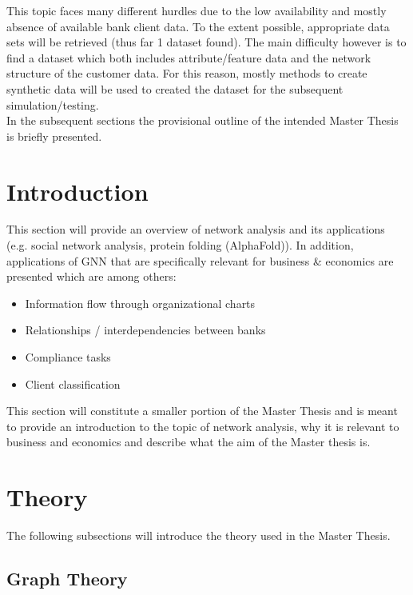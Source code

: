 \documentclass[12pt,a4paper]{article}
\begin{document}
	\noindent This topic faces many different hurdles due to the low availability and mostly absence of available bank client data. To the extent 
	possible, appropriate data sets will be retrieved (thus far 1 dataset found). The main difficulty however is to find a dataset which both includes 
	attribute/feature data and the network structure of the customer data. For this reason, mostly methods to create synthetic data will be used to 
	created the dataset for the subsequent simulation/testing. \\

	\noindent In the subsequent sections the provisional outline of the intended Master Thesis is briefly presented. 
	
	\section{Introduction}

	This section will provide an overview of network analysis and its applications (e.g. social network analysis, protein folding (AlphaFold)). 
	In addition, applications of GNN that are specifically relevant for business \& economics are presented which are among others:	
	
	\begin{itemize}
		\itemsep-0.5em
		\item Information flow through organizational charts
		\item Relationships / interdependencies between banks
		\item Compliance tasks 
		\item Client classification
	\end{itemize}
	
	\noindent This section will constitute a smaller portion of the Master Thesis and is meant to provide an introduction to the topic of network 
	analysis, why it is relevant to business and economics and describe what the aim of the Master thesis is.

	\section{Theory}
	
	The following subsections will introduce the theory used in the Master Thesis.

	\subsection{Graph Theory}
\end{document}
